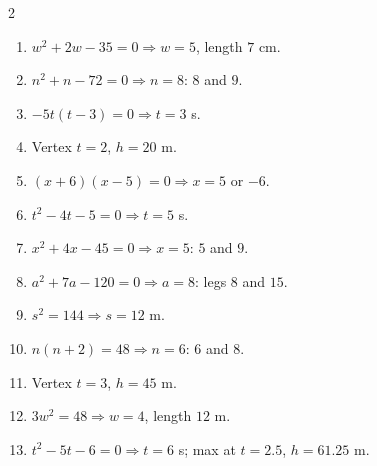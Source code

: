 \documentclass[11pt]{article}
\begin{document}
\begin{keybox}
\begin{multicols}{2}
\small
\begin{enumerate}[leftmargin=*,itemsep=3pt]
  \item $w^2+2w-35=0\Rightarrow w=5$, length $7$ cm.
  \item $n^2+n-72=0\Rightarrow n=8$: $8$ and $9$.
  \item $-5t(t-3)=0\Rightarrow t=3$ s.
  \item Vertex $t=2$, $h=20$ m.
  \item $(x+6)(x-5)=0\Rightarrow x=5$ or $-6$.
  \item $t^2-4t-5=0\Rightarrow t=5$ s.
  \item $x^2+4x-45=0\Rightarrow x=5$: $5$ and $9$.
  \item $a^2+7a-120=0\Rightarrow a=8$: legs $8$ and $15$.
  \item $s^2=144\Rightarrow s=12$ m.
  \item $n(n+2)=48\Rightarrow n=6$: $6$ and $8$.
  \item Vertex $t=3$, $h=45$ m.
  \item $3w^2=48\Rightarrow w=4$, length $12$ m.
  \item $t^2-5t-6=0\Rightarrow t=6$ s; max at $t=2.5$, $h=61.25$ m.
\end{enumerate}
\end{multicols}
\end{keybox}
\end{document}
